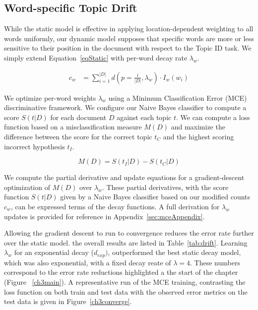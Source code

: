 \subsection{Word-specific Topic Drift}

While the static model is effective in applying location-dependent weighting to all words uniformly, our dynamic model supposes that specific words are more or less sensitive to their position in the document with respect to the Topic ID task.  We simply extend Equation~\ref{eqStatic} with per-word decay rate $\lambda_w$.

\begin{align}
c_{w} &= \sum_{i=1}^{|D|}{d\left(p=\frac{i}{|D|},\lambda_w\right) \cdot I_{w}(w_i)}
\label{eqDynamic}
\end{align}

We optimize per-word weights $\lambda_w$ using a Minimum Classification Error (MCE) discriminative framework.  We configure our Naive Bayes classifier to compute a score $S(t|D)$ for each document $D$ against each topic $t$.  We can compute a loss function based on a misclassification measure $M(D)$ and maximize the difference between the score for the correct topic $t_C$ and the highest scoring incorrect hypothesis $t_I$.

\begin{equation}
M(D)=S(t_I|D)-S(t_C|D)
\end{equation}

We compute the partial derivative and update equations for a gradient-descent optimization of $M(D)$ over $\lambda_w$.  These partial derivatives, with the score function $S(t|D)$ given by a Naive Bayes classifier based on our modified counts $c_w$, can be expressed terms of the decay functions.    A full derivation for $\lambda_w$ updates is provided for reference in Appendix~\ref{sec:mceAppendix}.  

Allowing the gradient descent to run to convergence reduces the error rate further over the static model.  the overall results are listed in Table~\ref{tab:drift}.  Learning $\lambda_w$ for an exponential decay ($d_{exp})$, outperformed the best static decay model, which was also exponential, with a fixed decay reate of $\lambda=4$.  These numbers correspond to the error rate reductions highlighted a the start of the chapter (Figure ~\ref{ch3main}). A representative run of the MCE training, contrasting the loss function on both train and test data with the observed error metrics on the test data is given in Figure~\ref{ch3converge}.  %


